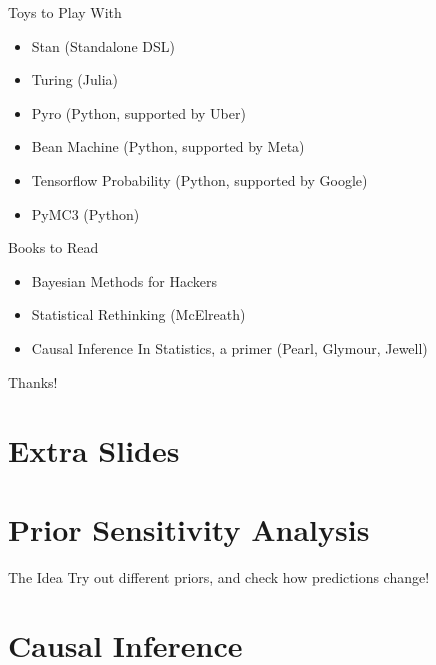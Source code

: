 \documentclass[aspectratio=169,xcolor=svgnames]{beamer}
\begin{document}
\begin{frame}
  \begin{block}{Toys to Play With}
    \begin{itemize}
    \item Stan (Standalone DSL)
    \item Turing (Julia)
    \item Pyro (Python, supported by Uber)
    \item Bean Machine (Python, supported by Meta)
    \item Tensorflow Probability (Python, supported by Google)
    \item PyMC3 (Python)
    \end{itemize}
  \end{block}
\end{frame}

\begin{frame}
  \begin{block}{Books to Read}
  \begin{itemize}
  \item Bayesian Methods for Hackers
  \item Statistical Rethinking (McElreath)
  \item Causal Inference In Statistics, a primer (Pearl, Glymour, Jewell)
  \end{itemize}
  \end{block}
\end{frame}

\begin{frame}
  \centering
  Thanks!
\end{frame}

\section{Extra Slides}

\section{Prior Sensitivity Analysis}

\begin{frame}{The Idea}
  \center
  Try out different priors, and check how predictions change!
\end{frame}

\section{Causal Inference}
\end{document}
